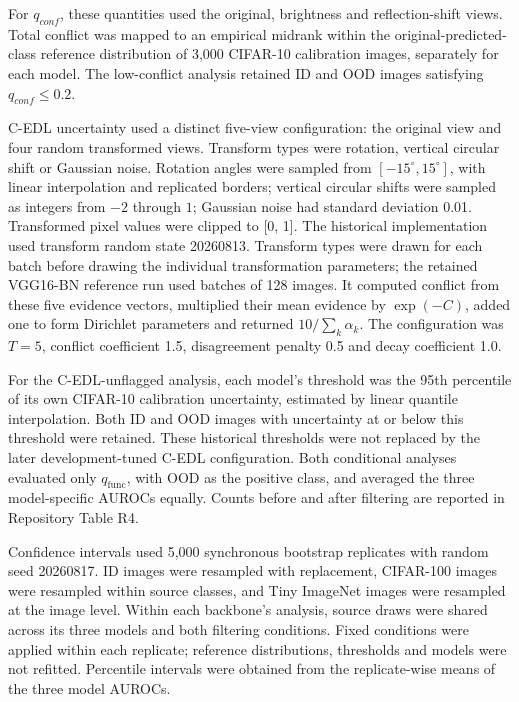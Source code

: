 \documentclass[11pt,a4paper]{article}
\begin{document}
For \(q_{conf}\), these quantities used the original, brightness and reflection-shift views. Total conflict was mapped to an empirical midrank within the original-predicted-class reference distribution of 3,000 CIFAR-10 calibration images, separately for each model. The low-conflict analysis retained ID and OOD images satisfying \(q_{conf} \leq 0.2\).

C-EDL uncertainty used a distinct five-view configuration: the original view and four random transformed views. Transform types were rotation, vertical circular shift or Gaussian noise. Rotation angles were sampled from \(\left\lbrack - 15^{\circ},15^{\circ} \right\rbrack\), with linear interpolation and replicated borders; vertical circular shifts were sampled as integers from \(- 2\) through \(1\); Gaussian noise had standard deviation 0.01. Transformed pixel values were clipped to {[}0, 1{]}. The historical implementation used transform random state 20260813. Transform types were drawn for each batch before drawing the individual transformation parameters; the retained VGG16-BN reference run used batches of 128 images. It computed conflict from these five evidence vectors, multiplied their mean evidence by \(\exp( - C)\), added one to form Dirichlet parameters and returned \(10/\sum_{k}^{}\alpha_{k}\). The configuration was \(T = 5\), conflict coefficient 1.5, disagreement penalty 0.5 and decay coefficient 1.0.

For the C-EDL-unflagged analysis, each model's threshold was the 95th percentile of its own CIFAR-10 calibration uncertainty, estimated by linear quantile interpolation. Both ID and OOD images with uncertainty at or below this threshold were retained. These historical thresholds were not replaced by the later development-tuned C-EDL configuration. Both conditional analyses evaluated only \(q_{\text{func}}\), with OOD as the positive class, and averaged the three model-specific AUROCs equally. Counts before and after filtering are reported in Repository Table R4.

Confidence intervals used 5,000 synchronous bootstrap replicates with random seed 20260817. ID images were resampled with replacement, CIFAR-100 images were resampled within source classes, and Tiny ImageNet images were resampled at the image level. Within each backbone's analysis, source draws were shared across its three models and both filtering conditions. Fixed conditions were applied within each replicate; reference distributions, thresholds and models were not refitted. Percentile intervals were obtained from the replicate-wise means of the three model AUROCs.
\end{document}
